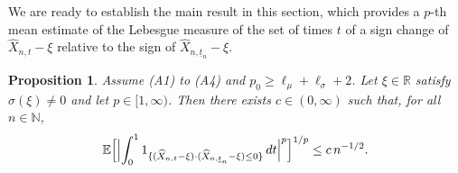\documentclass[11pt]{amsart}
\newcommand{\R}{{\mathbb R}}
\newcommand{\N}{{\mathbb N}}
\newcommand{\EE}{{\mathbb E}}
\newcommand{\eul}{{\widehat X}}
\newcommand{\ind}{1}
\newcommand{\utn}{\underline {t}_n}
\theoremstyle{plain}
\newtheorem{prop}{Proposition}
\theoremstyle{definition}
\begin{document}
We are ready to establish the main result in this section, which provides a $p$-th mean estimate of the
Lebesgue measure of the set
of times $t$ of a sign change of $\eul_{n,t}-\xi$ relative to the sign of $\eul_{n,\utn}-\xi$.

\begin{prop}\label{prop1}
Assume (A1) to (A4) and $p_0\ge \ell_\mu + \ell_\sigma +2$.
Let $\xi\in\R$ satisfy $\sigma(\xi)\not=0$ and let
 $p\in [1,\infty)$.
Then there exists  $c\in(0, \infty)$ such that, for all $n\in\N$,
\begin{equation}\label{l33}
\EE\Bigl[\Bigl|\int_0^1  \ind_{\{(\eul_{n,t}-\xi)\cdot(\eul_{n, \utn}-\xi)\leq 0\}}\,dt\Bigr|^p\Bigr]^{1/p}\leq c\,n^{-1/2}.
\end{equation}
\end{prop}
\end{document}
